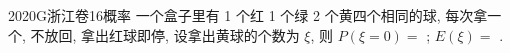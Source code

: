 
\begin{problem}{2020}{G}{浙江卷}{16}{概率}
一个盒子里有 1 个红 1 个绿 2 个黄四个相同的球, 每次拿一个, 不放回, 拿出红球即停, 设拿出黄球的个数为 $ \xi $, 则 $ P(\xi=0)= $ \underline{\hspace{4em}}; $ E(\xi)= $ \underline{\hspace{4em}}.
\end{problem}

\begin{answer}

\end{answer}

\begin{solutions}

\end{solutions}